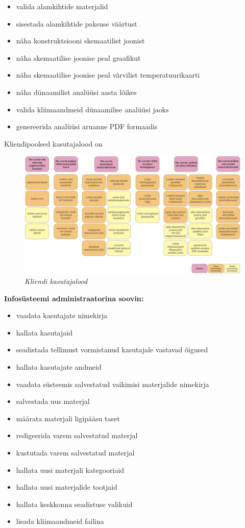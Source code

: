 \begin{itemize}
    \item valida alamkihtide materjalid
    \item sisestada alamkihtide paksuse väärtust
    \item näha konstruktsiooni skemaatilist joonist
    \item näha skemaatilise joonise peal graafikut
    \item näha skemaatilise joonise peal värvilist temperatuurikaarti
    \item näha dünaamilist analüüsi aasta lõikes
    \item valida kliimaandmeid dünaamilise analüüsi jaoks
    \item genereerida analüüsi aruanne PDF formaadis
\end{itemize}

Kliendipoolsed kasutajalood on 

\begin{figure}[ht]
    \centering
    \includegraphics[width=1\textwidth]{figures/analysis/client_userstories.png}
    \caption[Funktsionaalsed nõuded, kliendi kasutajalood]{\textit{Kliendi kasutajalood}}
    \label{fig:client_userstories}
\end{figure}

\textbf{Infosüsteemi administraatorina soovin:}
\begin{itemize}

    \item vaadata kasutajate nimekirja
    \item hallata kasutajaid
    \item seadistada tellimust vormistanud kasutajale vastavad õigused
    \item hallata kasutajate andmeid
    \item vaadata süsteemis salvestatud vaikimisi materjalide nimekirja
    \item salvestada uus materjal
    \item määrata materjali ligipääsu taset
    \item redigeerida varem salvestatud materjal
    \item kustutada varem salvestatud materjal
    \item hallata uusi materjali kategooriaid
    \item hallata uusi materjalide tootjaid
    \item hallata keskkonna seadistuse valikuid
    \item lisada kliimaandmeid failina
\end{itemize}


